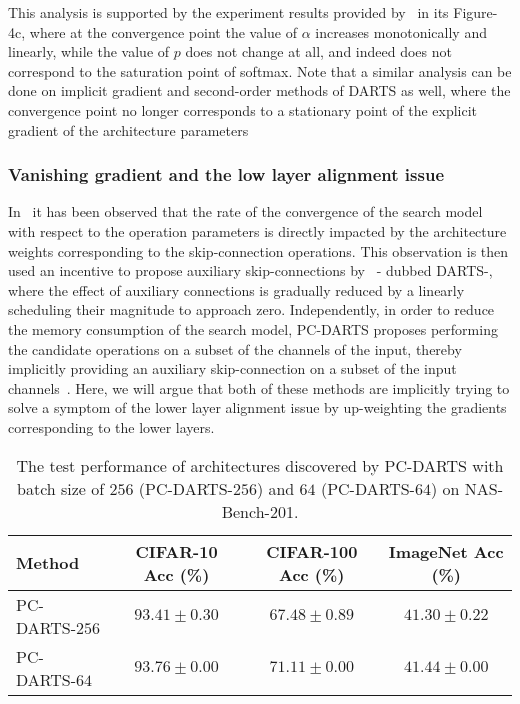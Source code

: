 \documentclass{article} \usepackage{fancyhdr, iclr2023_conference, times}
\newcommand{\lambdafn}{layer alignment\xspace}
\begin{document}
\par This analysis is supported by the experiment results provided by~\citep{DBLP:journals/corr/abs-2203-01665} in its Figure-4c, where at the convergence point the value of $\alpha$ increases monotonically and linearly, while the value of $p$ does not change at all, and indeed does not correspond to the saturation point of softmax. Note that a similar analysis can be done on implicit gradient and second-order methods of DARTS as well, where the convergence point no longer corresponds to a stationary point of the explicit gradient of the architecture parameters
\subsubsection{Vanishing gradient and the low \lambdafn issue}
\par In~\citep{DBLP:conf/nips/ZhouXSH20} it has been observed that the rate of the convergence of the search model with respect to the operation parameters is directly impacted by the architecture weights corresponding to the skip-connection operations. This observation is then used an incentive to propose auxiliary skip-connections by~\citep{DBLP:conf/iclr/ChuW0LWY21} - dubbed DARTS-, where the effect of auxiliary connections is gradually reduced by a linearly scheduling their magnitude to approach zero. Independently, in order to reduce the memory consumption of the search model, PC-DARTS proposes performing the candidate operations on a subset of the channels of the input, thereby implicitly providing an auxiliary skip-connection on a subset of the input channels~\citep{DBLP:conf/iclr/XuX0CQ0X20}. Here, we will argue that both of these methods are implicitly trying to solve a symptom of the lower \lambdafn issue by up-weighting the gradients corresponding to the lower layers.
\par 
\begin{table}[t]
\centering
\caption{The test performance of architectures discovered by PC-DARTS with batch size of $256$ (PC-DARTS-$256$) and $64$ (PC-DARTS-$64$) on NAS-Bench-201.} 
\label{table:pc-darts-bs}
\begin{tabular}{l|c|c|c}
\textbf{Method} & \textbf{CIFAR-10 Acc (\%)} & \textbf{CIFAR-100 Acc (\%)} & \textbf{ImageNet Acc (\%)}\\ \hline
    PC-DARTS-$256$ & $93.41\pm 0.30$ & $67.48\pm 0.89$ & $41.30\pm 0.22$ \\
    PC-DARTS-$64$ & $93.76\pm 0.00$ & $71.11\pm 0.00$ & $41.44\pm 0.00$
\end{tabular}
\end{table}
\end{document}
